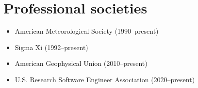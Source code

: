 \section{Professional societies}
\vspace{0.5em}

\begin{itemize}
  \item American Meteorological Society (1990--present)
  \item Sigma Xi (1992--present)
  \item American Geophysical Union (2010--present)
  \item U.S. Research Software Engineer Association (2020--present)
\end{itemize}
